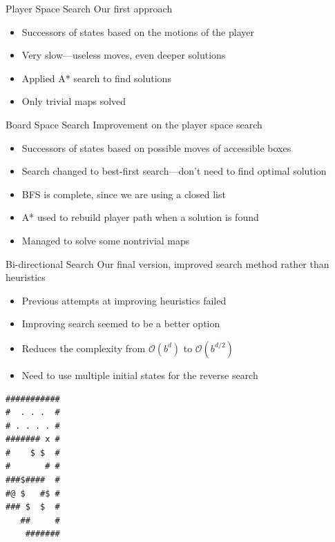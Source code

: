 \documentclass{beamer}
\begin{document}
\begin{frame}{Player Space Search}
  Our first approach
  \begin{itemize}
  \item Successors of states based on the motions of the player
  \item Very slow---useless moves, even deeper solutions
  \item Applied A* search to find solutions
  \item Only trivial maps solved
  \end{itemize}
\end{frame}

\begin{frame}{Board Space Search}
  Improvement on the player space search
  \begin{itemize}
  \item Successors of states based on possible moves of accessible boxes
  \item Search changed to best-first search---don't need to find optimal solution
  \item BFS is complete, since we are using a closed list
  \item A* used to rebuild player path when a solution is found
  \item Managed to solve some nontrivial maps
  \end{itemize}
\end{frame}

\begin{frame}{Bi-directional Search}
  Our final version, improved search method rather than heuristics
  \begin{itemize}
  \item Previous attempts at improving heuristics failed
  \item Improving search seemed to be a better option
  \item Reduces the complexity from $\mathcal{O}(b^d)$ to $\mathcal{O}(b^{d/2})$
  \item Need to use multiple initial states for the reverse search
  \end{itemize}
\end{frame}

\begin{lrbox}{\mapff}
  \begin{minipage}{.25\textwidth}
\centering
\begin{BVerbatim}
###########
#  . . .  #
# . . . . #
####### x #
#    $ $  #
#       # #
###$####  #
#@ $   #$ #
### $  $  #
   ##     #
    #######  
\end{BVerbatim}
  \end{minipage}
\end{lrbox}%
\end{document}
